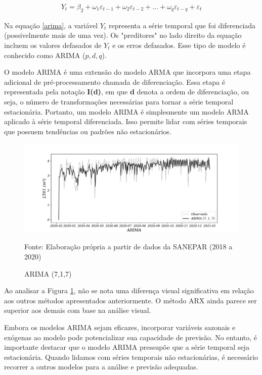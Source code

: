 \begin{eqnarray}
	Y_t = \beta_2 + \omega_1\varepsilon_{t-1} + \omega_2 \varepsilon_{t-2} +\ldots+ \omega_q \varepsilon_{t-q} + \varepsilon_t \label{arima}
\end{eqnarray}

Na equação \eqref{arima}, a variável $Y_t$ representa a série temporal que foi diferenciada (possivelmente mais de uma vez). Os "preditores" no lado direito da equação incluem os valores defasados de $Y_t$ e os erros defasados. Esse tipo de modelo é conhecido como ARIMA ($p, d, q$).

O modelo ARIMA é uma extensão do modelo ARMA que incorpora uma etapa adicional de pré-processamento chamada de diferenciação. Essa etapa é representada pela notação \textbf{I(d)}, em que \textbf{d} denota a ordem de diferenciação, ou seja, o número de transformações necessárias para tornar a série temporal estacionária. Portanto, um modelo ARIMA é simplesmente um modelo ARMA aplicado à série temporal diferenciada. Isso permite lidar com séries temporais que possuem tendências ou padrões não estacionários.

\begin{figure}[H]
	\centering
	\caption{ARIMA (7,1,7)}
	\label{fig:1-arima}
	\includegraphics[width=0.9\linewidth]{Modelos/Figuras/0-ARIMA}
	
	Fonte: Elaboração própria a partir de dados da SANEPAR (2018 a 2020)
\end{figure}

Ao analisar a Figura \ref{fig:1-arima}, não se nota uma diferença visual significativa em relação aos outros métodos apresentados anteriormente. O método ARX ainda parece ser superior aos demais com base na análise visual.

Embora os modelos ARIMA sejam eficazes, incorporar variáveis sazonais e exógenas ao modelo pode potencializar sua capacidade de previsão. No entanto, é importante destacar que o modelo ARIMA pressupõe que a série temporal seja estacionária. Quando lidamos com séries temporais não estacionárias, é necessário recorrer a outros modelos para a análise e previsão adequadas.

